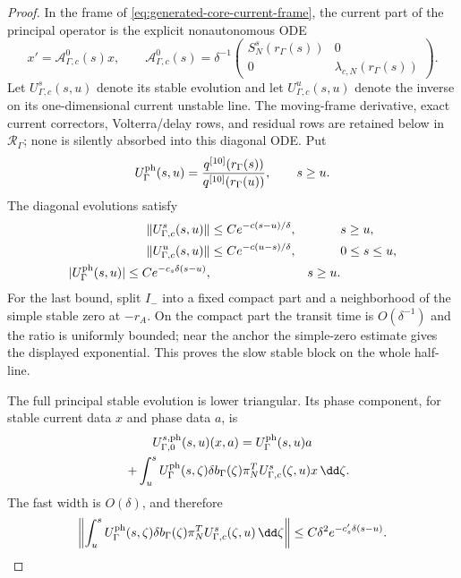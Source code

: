\begin{proof}
In the frame of \cref{eq:generated-core-current-frame}, the current part of
the principal operator is the explicit nonautonomous ODE
\begin{equation}
 x'=\mathcal A_{\Gamma,c}^0(s)x,\qquad
 \mathcal A_{\Gamma,c}^0(s)
 =\delta^{-1}
   \begin{pmatrix}
    S_N^s(r_\Gamma(s))&0\\0&\lambda_{c,N}(r_\Gamma(s))
   \end{pmatrix}.                                    \label{eq:anchor-reference-principal-current-operator}
\end{equation}
Let \(U_{\Gamma,c}^{s}(s,u)\) denote its stable evolution and let
\(U_{\Gamma,c}^{u}(s,u)\) denote the inverse on its one-dimensional current
unstable line.  The moving-frame derivative, exact current correctors,
Volterra/delay rows, and residual rows are retained below in
\(\mathcal R_\Gamma\); none is silently absorbed into this diagonal ODE.
Put
\begin{equation}
 U_\Gamma^{\rm ph}(s,u)
 =\frac{q^{[10]}(r_\Gamma(s))}
        {q^{[10]}(r_\Gamma(u))},\qquad s\ge u.          \label{eq:anchor-reference-phase-evolution}
\end{equation}
The diagonal evolutions satisfy
\begin{align}
 \|U_{\Gamma,c}^{s}(s,u)\|
 &\le Ce^{-c(s-u)/\delta},&&s\ge u,\notag\\
 \|U_{\Gamma,c}^{u}(s,u)\|
 &\le Ce^{-c(u-s)/\delta},&&0\le s\le u,\notag\\
 |U_\Gamma^{\rm ph}(s,u)|
 \le Ce^{-c_s\delta(s-u)},&&s\ge u.                  \label{eq:anchor-reference-principal-evolution}
\end{align}
For the last bound, split \(I_-\) into a fixed compact part and a
neighborhood of the simple stable zero at \(-r_A\).  On the compact part
the transit time is \(O(\delta^{-1})\) and the ratio is uniformly bounded;
near the anchor the simple-zero estimate gives the displayed exponential.
This proves the slow stable block on the whole half-line.

The full principal stable evolution is lower triangular.  Its phase
component, for stable current data \(x\) and phase data \(a\), is
\begin{multline}
 U_{\Gamma,0}^{s,{\rm ph}}(s,u)(x,a)
 =U_\Gamma^{\rm ph}(s,u)a\\
 \quad+\int_u^sU_\Gamma^{\rm ph}(s,\zeta)
       \delta b_\Gamma(\zeta)\pi_N^T
       U_{\Gamma,c}^{s}(\zeta,u)x\,\dd\zeta .          \label{eq:anchor-reference-stable-offdiagonal}
\end{multline}
The fast width is \(O(\delta)\), and therefore
\begin{equation}
 \left\|\int_u^sU_\Gamma^{\rm ph}(s,\zeta)
       \delta b_\Gamma(\zeta)\pi_N^T
       U_{\Gamma,c}^{s}(\zeta,u)\,\dd\zeta\right\|
 \le C\delta^2e^{-c_s'\delta(s-u)}.                  \label{eq:anchor-reference-stable-offdiagonal-bound}
\end{equation}


\end{proof}
